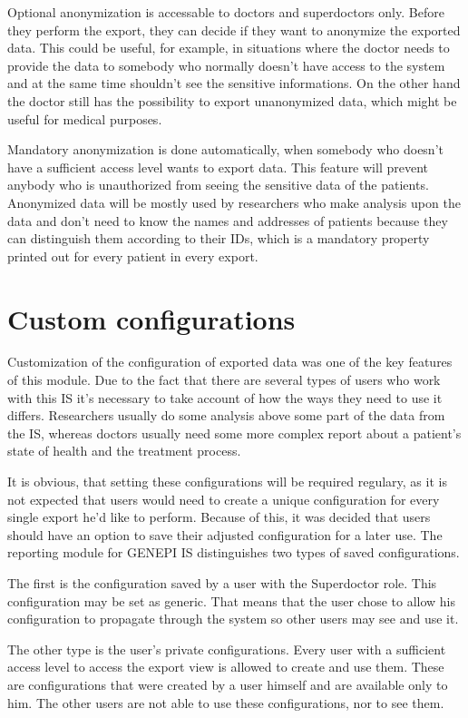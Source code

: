 \documentclass[thesis=B,english]{FITthesis}[2012/10/20]
\begin{document}
Optional anonymization is accessable to doctors and superdoctors only. Before they perform the export, they can decide if they want to anonymize the exported data. This could be useful, for example, in situations where the doctor needs to provide the data to somebody who normally doesn't have access to the system and at the same time shouldn't see the sensitive informations. On the other hand the doctor still has the possibility to export unanonymized data, which might be useful for medical purposes.

Mandatory anonymization is done automatically, when somebody who doesn't have a sufficient access level wants to export data. This feature will prevent anybody who is unauthorized from seeing the sensitive data of the patients. Anonymized data will be mostly used by researchers who make analysis upon the data and don't need to know the names and addresses of patients because they can distinguish them according to their IDs, which is a mandatory property  printed out for every patient in every export.
\section{Custom configurations}
Customization of the configuration of exported data was one of the key features of this module. Due to the fact that there are several types of users who work with this IS it's necessary to take account of how the ways they need to use it differs. Researchers usually do some analysis above some part of the data from the IS, whereas doctors usually need some more complex report about a patient's state of health and the treatment process.

It is obvious, that setting these configurations will be required regulary, as it is not expected that users would need to create a unique configuration for every single export he'd like to perform. Because of this, it was decided that users should have an option to save their adjusted configuration for a later use. The reporting module for GENEPI IS distinguishes two types of saved configurations.

The first is the configuration saved by a user with the Superdoctor role. This configuration may be set as generic. That means that the user chose to allow his configuration to propagate through the system so other users may see and use it.

The other type is the user's private configurations. Every user with a sufficient access level to access the export view is allowed to create and use them. These are configurations that were created by a user himself and are available only to him. The other users are not able to use these configurations, nor to see them.
\end{document}
